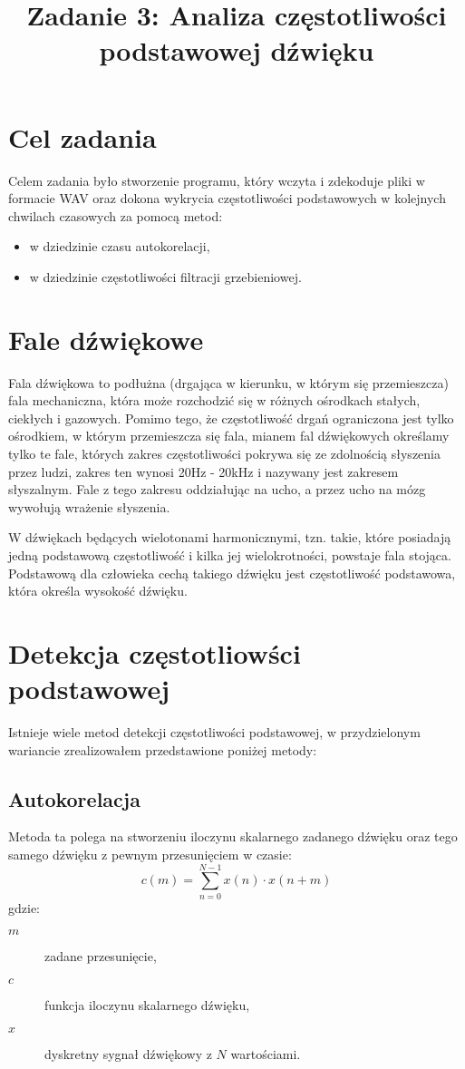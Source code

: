 \documentclass{classrep}
\author{%
  \studentinfo{Michał Janiszewski}{169485}
}
\title{Zadanie 3: Analiza częstotliwości podstawowej dźwięku}
\begin{document}
\maketitle

\section{Cel zadania}
Celem zadania było stworzenie programu, który wczyta i zdekoduje pliki w formacie WAV oraz dokona wykrycia częstotliwości podstawowych w kolejnych chwilach czasowych za pomocą metod:
\begin{itemize}
 \item w dziedzinie czasu \ppauza autokorelacji,
 \item w dziedzinie częstotliwości \ppauza filtracji grzebieniowej.
\end{itemize}

\section{Fale dźwiękowe}
Fala dźwiękowa to podłużna (drgająca w kierunku, w którym się przemieszcza) fala mechaniczna, która może rozchodzić się w różnych ośrodkach \ppauza stałych, ciekłych i gazowych. Pomimo tego, że częstotliwość drgań ograniczona jest tylko ośrodkiem, w którym przemieszcza się fala, mianem fal dźwiękowych określamy tylko te fale, których zakres częstotliwości pokrywa się ze zdolnością słyszenia przez ludzi, zakres ten wynosi 20Hz - 20kHz i nazywany jest zakresem słyszalnym. Fale z tego zakresu oddziałując na ucho, a przez ucho na mózg wywołują wrażenie słyszenia.

W dźwiękach będących wielotonami harmonicznymi, tzn. takie, które posiadają jedną podstawową częstotliwość i kilka jej wielokrotności, powstaje fala stojąca. Podstawową dla człowieka cechą takiego dźwięku jest częstotliwość podstawowa, która określa wysokość dźwięku.

\section{Detekcja częstotliowści podstawowej}
Istnieje wiele metod detekcji częstotliwości podstawowej, w przydzielonym wariancie zrealizowałem przedstawione poniżej metody:
\subsection{Autokorelacja}
\label{sec.autocorrelation}
Metoda ta polega na stworzeniu iloczynu skalarnego zadanego dźwięku oraz tego samego dźwięku z pewnym przesunięciem w czasie:
\begin{equation}
 c(m) = \displaystyle \sum^{N - 1}_{n = 0} x(n) \cdot x(n + m)
\end{equation}
gdzie:
\begin{description}
 \item[$m$] zadane przesunięcie,
 \item[$c$] funkcja iloczynu skalarnego dźwięku,
 \item[$x$] dyskretny sygnał dźwiękowy z $N$ wartościami.
\end{description}
\end{document}
